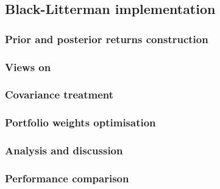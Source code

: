 \documentclass[11pt]{article}
\begin{document}
\subsection{Black-Litterman implementation}
\label{sec:org9f535a6}
\subsubsection{Prior and posterior returns construction}
\label{sec:orge69f300}
\subsubsection{Views on}
\label{sec:org55d708d}
\subsubsection{Covariance treatment}
\label{sec:org9a50ea6}
\subsubsection{Portfolio weights optimisation}
\label{sec:orgf604020}
\subsubsection{Analysis and discussion}
\label{sec:org8434619}
\subsubsection{Performance comparison}
\label{sec:orgac02026}
\end{document}
